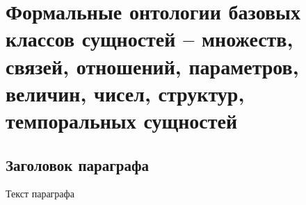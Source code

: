 
\chapter{Формальные онтологии базовых классов сущностей -- множеств, связей, отношений, параметров, величин, чисел, структур, темпоральных сущностей}
\label{chapter_top_ontologies}


\section{Заголовок параграфа}
Текст параграфа

%